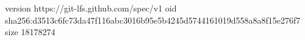 version https://git-lfs.github.com/spec/v1
oid sha256:d3513c6fc73da47f116abc3016b95e5b4245d5744161019d558a8a8f15e276f7
size 18178274
